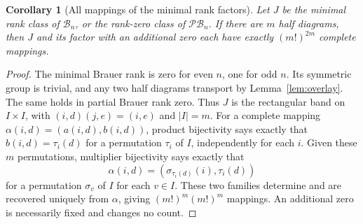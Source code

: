 \documentclass[11pt,a4paper]{article}
\newtheorem{corollary}[theorem]{Corollary}
\newcommand{\B}{\mathcal B}
\newcommand{\PB}{\mathcal{PB}}
\begin{document}
\begin{corollary}[All mappings of the minimal rank factors]\label{cor:enumeration}
Let $J$ be the minimal rank class of $\B_n$, or the rank-zero class of $\PB_n$. If there are $m$ half diagrams, then $J$ and its factor with an additional zero each have exactly $(m!)^{2m}$ complete mappings.
\end{corollary}
\begin{proof}
The minimal Brauer rank is zero for even $n$, one for odd $n$. Its symmetric group is trivial, and any two half diagrams transport by Lemma~\ref{lem:overlay}. The same holds in partial Brauer rank zero. Thus $J$ is the rectangular band on $I\times I$, with $(i,d)(j,e)=(i,e)$ and $|I|=m$.
For a complete mapping $\alpha(i,d)=(a(i,d),b(i,d))$, product bijectivity says exactly that $b(i,d)=\tau_i(d)$ for a permutation $\tau_i$ of $I$, independently for each $i$. Given these $m$ permutations, multiplier bijectivity says exactly that
\[
 \alpha(i,d)=(\sigma_{\tau_i(d)}(i),\tau_i(d))
\]
for a permutation $\sigma_v$ of $I$ for each $v\in I$. These two families determine and are recovered uniquely from $\alpha$, giving $(m!)^m(m!)^m$ mappings. An additional zero is necessarily fixed and changes no count.
\end{proof}
\end{document}
